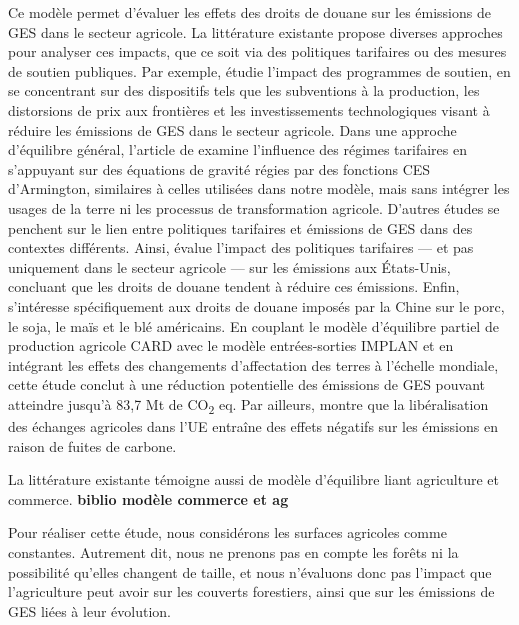 Ce modèle permet d'évaluer les effets des droits de douane sur les émissions de GES dans le secteur agricole. La littérature existante propose diverses approches pour analyser ces impacts, que ce soit via des politiques tarifaires ou des mesures de soutien publiques. Par exemple, \cite{Laborde2020} étudie l’impact des programmes de soutien, en se concentrant sur des dispositifs tels que les subventions à la production, les distorsions de prix aux frontières et les investissements technologiques visant à réduire les émissions de GES dans le secteur agricole. Dans une approche d'équilibre général, l'article de \cite{Shin2025} examine l'influence des régimes tarifaires en s'appuyant sur des équations de gravité régies par des fonctions CES d’Armington, similaires à celles utilisées dans notre modèle, mais sans intégrer les usages de la terre ni les processus de transformation agricole. D'autres études se penchent sur le lien entre politiques tarifaires et émissions de GES dans des contextes différents. Ainsi, \cite{Cary2020} évalue l’impact des politiques tarifaires — et pas uniquement dans le secteur agricole — sur les émissions aux États-Unis, concluant que les droits de douane tendent à réduire ces émissions. Enfin, \cite{Elobeid2021} s'intéresse spécifiquement aux droits de douane imposés par la Chine sur le porc, le soja, le maïs et le blé américains. En couplant le modèle d'équilibre partiel de production agricole CARD avec le modèle entrées-sorties IMPLAN et en intégrant les effets des changements d'affectation des terres à l'échelle mondiale, cette étude conclut à une réduction potentielle des émissions de GES pouvant atteindre jusqu'à 83,7 Mt de CO\textsubscript{2} eq. Par ailleurs, \cite{Himics2018} montre que la libéralisation des échanges agricoles dans l'UE entraîne des effets négatifs sur les émissions en raison de fuites de carbone.

La littérature existante témoigne aussi de modèle d'équilibre liant agriculture et commerce. \textbf{biblio modèle commerce et ag}






Pour réaliser cette étude, nous considérons les surfaces agricoles comme constantes. Autrement dit, nous ne prenons pas en compte les forêts ni la possibilité qu'elles changent de taille, et nous n'évaluons donc pas l’impact que l’agriculture peut avoir sur les couverts forestiers, ainsi que sur les émissions de GES liées à leur évolution.

